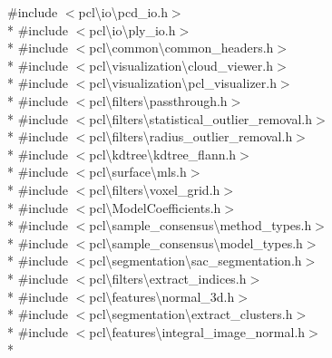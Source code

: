{\ttfamily \#include $<$pcl\textbackslash{}io\textbackslash{}pcd\-\_\-io.\-h$>$}\\*
{\ttfamily \#include $<$pcl\textbackslash{}io\textbackslash{}ply\-\_\-io.\-h$>$}\\*
{\ttfamily \#include $<$pcl\textbackslash{}common\textbackslash{}common\-\_\-headers.\-h$>$}\\*
{\ttfamily \#include $<$pcl\textbackslash{}visualization\textbackslash{}cloud\-\_\-viewer.\-h$>$}\\*
{\ttfamily \#include $<$pcl\textbackslash{}visualization\textbackslash{}pcl\-\_\-visualizer.\-h$>$}\\*
{\ttfamily \#include $<$pcl\textbackslash{}filters\textbackslash{}passthrough.\-h$>$}\\*
{\ttfamily \#include $<$pcl\textbackslash{}filters\textbackslash{}statistical\-\_\-outlier\-\_\-removal.\-h$>$}\\*
{\ttfamily \#include $<$pcl\textbackslash{}filters\textbackslash{}radius\-\_\-outlier\-\_\-removal.\-h$>$}\\*
{\ttfamily \#include $<$pcl\textbackslash{}kdtree\textbackslash{}kdtree\-\_\-flann.\-h$>$}\\*
{\ttfamily \#include $<$pcl\textbackslash{}surface\textbackslash{}mls.\-h$>$}\\*
{\ttfamily \#include $<$pcl\textbackslash{}filters\textbackslash{}voxel\-\_\-grid.\-h$>$}\\*
{\ttfamily \#include $<$pcl\textbackslash{}\-Model\-Coefficients.\-h$>$}\\*
{\ttfamily \#include $<$pcl\textbackslash{}sample\-\_\-consensus\textbackslash{}method\-\_\-types.\-h$>$}\\*
{\ttfamily \#include $<$pcl\textbackslash{}sample\-\_\-consensus\textbackslash{}model\-\_\-types.\-h$>$}\\*
{\ttfamily \#include $<$pcl\textbackslash{}segmentation\textbackslash{}sac\-\_\-segmentation.\-h$>$}\\*
{\ttfamily \#include $<$pcl\textbackslash{}filters\textbackslash{}extract\-\_\-indices.\-h$>$}\\*
{\ttfamily \#include $<$pcl\textbackslash{}features\textbackslash{}normal\-\_\-3d.\-h$>$}\\*
{\ttfamily \#include $<$pcl\textbackslash{}segmentation\textbackslash{}extract\-\_\-clusters.\-h$>$}\\*
{\ttfamily \#include $<$pcl\textbackslash{}features\textbackslash{}integral\-\_\-image\-\_\-normal.\-h$>$}\\*
